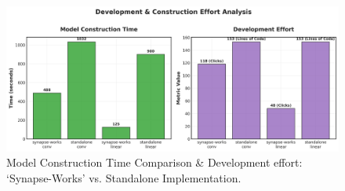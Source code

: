 \documentclass[10pt,conference]{IEEEtran}
\begin{document}
\begin{table}[!htbp]
    \centering
    \caption{Synapse-Works: Model Execution and Construction Metrics (Time in Seconds)}
    \label{tab:synapseworks-results}
\end{table}

\begin{table}[!htbp]
    \centering
    \caption{Standalone Scripts: Model Execution and Construction Metrics (Time in Seconds)}
    \label{tab:standalone-results}
\end{table}

\begin{figure}[!htbp]
    \centering
    \includegraphics[width=\columnwidth]{2_construction_effort.png}
    \caption{Model Construction Time Comparison \& Development effort: `Synapse-Works' vs. Standalone Implementation.}
    \label{fig:construction_metrics}
\end{figure}
\end{document}

